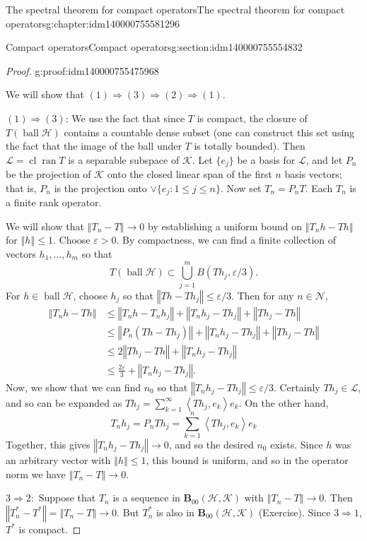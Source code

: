 \documentclass[oneside,10pt,]{book}
\numberwithin{equation}{section}
\DeclareMathOperator{\cl}{cl}
\DeclareMathOperator{\ball}{ball}
\newcommand{\eps}{\varepsilon}
\newcommand{\hilbert}{\mathcal{H}}
\newcommand{\K}{\mathcal{K}}
\newcommand{\N}{\mathcal{N}}
\newcommand{\BOP}{\mathbf{B}}
\newcommand{\norm}[1]{\left\Vert#1\right\Vert}
\newcommand{\ran}[1]{\operatorname{ran}#1}
\newcommand{\ip}[2]{\left\langle #1, #2 \right\rangle}
\newcommand{\ad}{^\ast}
\newcommand\ep{\varepsilon}
\numberwithin{equation}{section}
\newcommand{\amp}{&}
\begin{document}
\begin{chapterptx}{The spectral theorem for compact operators}{}{The spectral theorem for compact operators}{}{}{g:chapter:idm140000755581296}
\begin{sectionptx}{Compact operators}{}{Compact operators}{}{}{g:section:idm140000755554832}
\begin{proof}{}{g:proof:idm140000755475968}
\par
We will show that \((1) \Rightarrow (3) \Rightarrow (2) \Rightarrow (1)\).%
\par
\((1) \Rightarrow (3)\): We use the fact that since \(T\) is compact, the closure of \(T(\ball \hilbert)\) contains a countable dense subset (one can construct this set using the fact that the image of the ball under \(T\) is totally bounded). Then \(\mathcal L = \cl \ran T\) is a separable subspace of \(\K\). Let \(\{e_j\}\) be a basis for \(\mathcal L\), and let \(P_n\) be the projection of \(\K\) onto the closed linear span of the first \(n\) basis vectors; that is, \(P_n\) is the projection onto \(\vee\{e_j: 1 \leq j \leq n\}\). Now set \(T_n = P_n T\). Each \(T_n\) is a finite rank operator.%
\par
We will show that \(\norm{T_n - T} \to 0\) by establishing a uniform bound on \(\norm{T_n h - T h}\) for \(\norm{h}\leq 1\). Choose \(\eps > 0\). By compactness, we can find a finite collection of vectors \(h_1, \ldots, h_m\) so that%
\begin{equation*}
T(\ball \hilbert) \subset \bigcup_{j = 1}^m B(Th_j, \ep/3).
\end{equation*}
For \(h \in \ball \hilbert\), choose \(h_j\) so that \(\norm{Th - Th_j} \leq \eps/3\). Then for any \(n \in \N\),%
\begin{align*}
\norm{T_n h - T h} \amp\leq \norm{T_n h - T_n h_j } + \norm{T_n h_j  - T h_j} + \norm{T h_j - T h} \\
\amp \leq\norm{P_n(T h - T h_j) } + \norm{T_n h_j  - T h_j} + \norm{T h_j - T h} \\
\amp\leq 2\norm{T h_j - T h} + \norm{T_n h_j  - T h_j}\\
\amp\leq \frac{2\eps}{3} + \norm{T_n h_j  - T h_j}.
\end{align*}
Now, we show that we can find \(n_0\) so that \(\norm{T_n h_j  - T h_j} \leq \eps/3\). Certainly \(Th_j \in \mathcal{L}\), and so can be expanded as \(Th_j = \sum_{k=1}^\infty \ip{Th_j}{ e_k} e_k\). On the other hand,%
\begin{equation*}
T_n h_j = P_n T h_j = \sum_{k=1}^n \ip{Th_j}{ e_k} e_k
\end{equation*}
Together, this gives \(\norm{T_n h_j - T h_j} \to 0\), and so the desired \(n_0\) exists. Since \(h\) was an arbitrary vector with \(\norm{h} \leq 1\), this bound is uniform, and so in the operator norm we have \(\norm{T_n - T} \to 0\).%
\par
\(3 \Rightarrow 2:\) Suppose that \(T_n\) is a sequence in \(\BOP_{00}(\hilbert, \K)\) with \(\norm{T_n - T} \to 0\). Then \(\norm{T_n\ad - T\ad} = \norm{T_n - T} \to 0\). But \(T_n\ad\) is also in \(\BOP_{00}(\hilbert, \K)\) (Exercise). Since \(3 \Rightarrow 1\), \(T\ad\) is compact.%

\end{proof}
\end{sectionptx}
\end{chapterptx}
\end{document}
